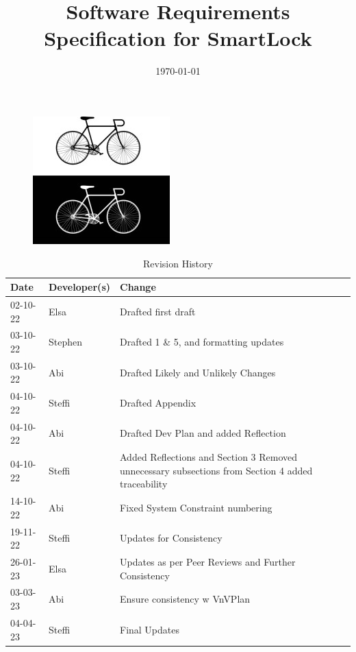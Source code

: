 \documentclass[12pt]{article}
\begin{document}
\title{Software Requirements Specification for SmartLock\\\progname} 
\author{\authname}
\date{\today}
	
\maketitle
\thispagestyle{empty}
\begin{figure}[h!]
  \centering
  \includegraphics[width=0.4\linewidth]{../BikeLogo.jpg}
\end{figure}

\newpage
{}
\begin{table}[hp]
\caption{Revision History} \label{TblRevisionHistory}
\begin{tabularx}{\textwidth}{llX}
\toprule
\textbf{Date} & \textbf{Developer(s)} & \textbf{Change}\\
\midrule
02-10-22 & Elsa & Drafted first draft\\
03-10-22 & Stephen & Drafted 1 \& 5, and formatting updates\\
03-10-22 & Abi & Drafted Likely and Unlikely Changes\\
04-10-22 & Steffi & Drafted Appendix\\
04-10-22 & Abi & Drafted Dev Plan and added Reflection\\
04-10-22 & Steffi & Added Reflections and Section 3 Removed unnecessary subsections from Section 4 added traceability\\
14-10-22 & Abi & Fixed System Constraint numbering\\
19-11-22 & Steffi & Updates for Consistency\\
26-01-23 & Elsa & Updates as per Peer Reviews and Further Consistency\\
03-03-23 & Abi & Ensure consistency w VnVPlan\\
04-04-23 & Steffi & Final Updates\\
\bottomrule
\end{tabularx}
\end{table}
\end{document}
